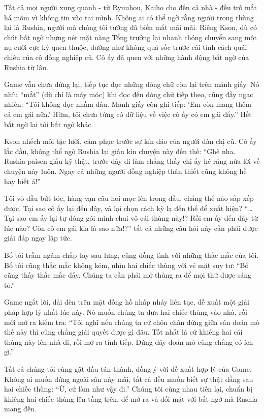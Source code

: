 ﻿\documentclass[../main.tex]{subfiles}
\begin{document}
Tất cả mọi người xung quanh - từ Ryuuhou, Kaiho cho đến cả nhà - đều trố mắt há mồm vì không tin vào tai mình. Không ai có thể ngờ rằng người trong thùng lại là Rushia, người mà chúng tôi tưởng đã biến mất mãi mãi. Riêng Kson, dù có chút bất ngờ nhưng nét mặt nàng Tổng trưởng lại nhanh chóng chuyển sang một nụ cười cực kỳ quen thuộc, dường như không quá sốc trước cái tính cách quái chiêu của cô đồng nghiệp cũ. Cô ấy đã quen với những hành động bất ngờ của Rushia từ lâu.

Game vẫn chưa dừng lại, tiếp tục đọc những dòng chữ còn lại trên mảnh giấy. Nó nhíu ``mắt'' (dù chỉ là máy móc) khi đọc đến dòng chữ tiếp theo, cũng đầy ngạc nhiên: ``Tôi không đọc nhầm đâu. Mảnh giấy còn ghi tiếp: `Em còn mang thêm cả em gái nữa.' Hừm, tôi chưa từng có dữ liệu về việc cô ấy có em gái đấy.'' Hết bất ngờ lại tới bất ngờ khác.

Kson nhếch môi tặc lưỡi, cảm phục trước sự kín đáo của người đàn chị cũ. Cô ấy lắc đầu, không thể ngờ Rushia lại giấu kín chuyện này đến thế: ``Ghê nha. Rushia-paisen giấu kỹ thật, trước đây đi làm chẳng thấy chị ấy hé răng nửa lời về chuyện này luôn. Ngay cả những người đồng nghiệp thân thiết cũng không hề hay biết á!''

Tôi vò đầu bứt tóc, hàng vạn câu hỏi mọc lên trong đầu, chẳng thể nào sắp xếp được. Tại sao cô ấy lại đến đây, và lại chọn cách kỳ lạ đến thế để xuất hiện? ``\dots Tại sao em ấy lại tự đóng gói mình chui vô cái thùng này!? Rồi em ấy đến đây từ lúc nào? Còn cô em gái kia là sao nữa!?'' tất cả những câu hỏi này cần phải được giải đáp ngay lập tức.

Bố tôi trầm ngâm chắp tay sau lưng, cũng đồng tình với những thắc mắc của tôi. Bố tôi cũng thắc mắc không kém, nhìn hai chiếc thùng với vẻ mặt suy tư: ``Bố cũng thấy thắc mắc đấy. Chúng ta cần phải mở thùng ra để mọi thứ được sáng tỏ.''

Game ngắt lời, dải đèn trên mặt đồng hồ nhấp nháy liên tục, đề xuất một giải pháp hợp lý nhất lúc này. Nó muốn chúng ta đưa hai chiếc thùng vào nhà, rồi mới mở ra kiểm tra: ``Tôi nghĩ nếu chúng ta cứ chôn chân đứng giữa sân đoán mò thế này thì cũng chẳng giải quyết được gì đâu. Tốt nhất là cứ khiêng hai cái thùng này lên nhà đi, rồi mở ra tính tiếp. Đứng đây đoán mò cũng chẳng có ích gì.''

Tất cả chúng tôi cùng gật đầu tán thành, đồng ý với đề xuất hợp lý của Game. Không ai muốn đứng ngoài sân này mãi, tất cả đều muốn biết sự thật đằng sau hai chiếc thùng: ``Ừ, cứ làm như vậy đi.'' Chúng tôi cùng nhau tiến lại, chuẩn bị khiêng hai chiếc thùng lên tầng trên, để mở ra và đối mặt với bất ngờ mà Rushia mang đến.
\end{document}
